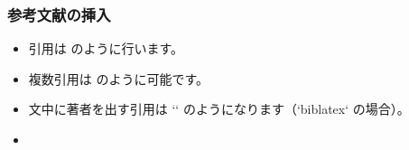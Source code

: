 \begin{frame}
    \frametitle{参考文献の挿入}
    \begin{itemize}
        \item 引用は \cite{einstein1905annus} のように行います。
        \item 複数引用は \cite{knuth1984texbook, turing1936computable} のように可能です。
        \item 文中に著者を出す引用は `\textcite{einstein1905annus}` のようになります（`biblatex` の場合）。
        \item {}
    \end{itemize}
\end{frame}